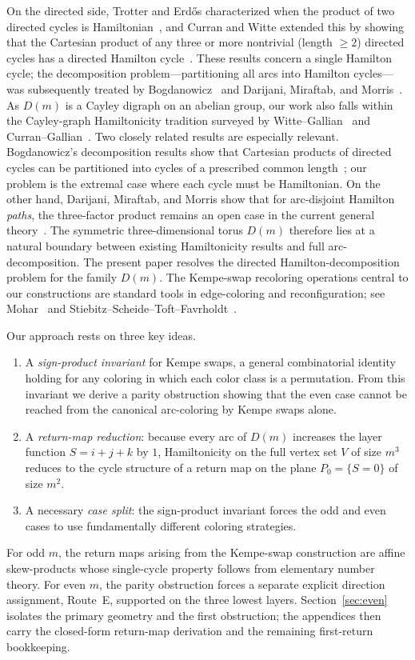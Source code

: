 \documentclass[11pt]{article}
\begin{document}
On the directed side, Trotter and Erd\H{o}s characterized when the product of two directed cycles is Hamiltonian~\cite{TrotterErdos1978}, and Curran and Witte extended this by showing that the Cartesian product of any three or more nontrivial (length $\ge 2$) directed cycles has a directed Hamilton cycle~\cite{CurranWitte1985}.
These results concern a single Hamilton cycle; the decomposition problem---partitioning all arcs into Hamilton cycles---was subsequently treated by Bogdanowicz~\cite{Bogdanowicz2017,Bogdanowicz2020} and Darijani, Miraftab, and Morris~\cite{DarijaniMiraftabMorris2022}.
As $D(m)$ is a Cayley digraph on an abelian group, our work also falls within the Cayley-graph Hamiltonicity tradition surveyed by Witte--Gallian~\cite{WitteGallian1984} and Curran--Gallian~\cite{CurranGallian1996}.
Two closely related results are especially relevant.
Bogdanowicz's decomposition results show that Cartesian products of directed cycles can be partitioned into cycles of a prescribed common length~\cite{Bogdanowicz2017}; our problem is the extremal case where each cycle must be Hamiltonian.
On the other hand, Darijani, Miraftab, and Morris show that for arc-disjoint Hamilton \emph{paths}, the three-factor product remains an open case in the current general theory~\cite{DarijaniMiraftabMorris2022}.
The symmetric three-dimensional torus $D(m)$ therefore lies at a natural boundary between existing Hamiltonicity results and full arc-decomposition.
The present paper resolves the directed Hamilton-decomposition problem for the family $D(m)$.
The Kempe-swap recoloring operations central to our constructions are standard tools in edge-coloring and reconfiguration; see Mohar~\cite{Mohar2006} and Stiebitz--Scheide--Toft--Favrholdt~\cite{StiebitzEtAl2012}.

Our approach rests on three key ideas.
\begin{enumerate}[label=\textup{(\roman*)},leftmargin=2.5em]
\item A \emph{sign-product invariant} for Kempe swaps, a general combinatorial identity holding for any coloring in which each color class is a permutation.
From this invariant we derive a parity obstruction showing that the even case cannot be reached from the canonical arc-coloring by Kempe swaps alone.
\item A \emph{return-map reduction}: because every arc of $D(m)$ increases the layer function $S=i+j+k$ by $1$, Hamiltonicity on the full vertex set $V$ of size $m^3$ reduces to the cycle structure of a return map on the plane $P_0=\{S=0\}$ of size $m^2$.
\item A necessary \emph{case split}: the sign-product invariant forces the odd and even cases to use fundamentally different coloring strategies.
\end{enumerate}
For odd $m$, the return maps arising from the Kempe-swap construction are affine skew-products whose single-cycle property follows from elementary number theory.
For even $m$, the parity obstruction forces a separate explicit direction assignment, Route~E, supported on the three lowest layers.
Section~\ref{sec:even} isolates the primary geometry and the first obstruction; the appendices then carry the closed-form return-map derivation and the remaining first-return bookkeeping.
\end{document}
